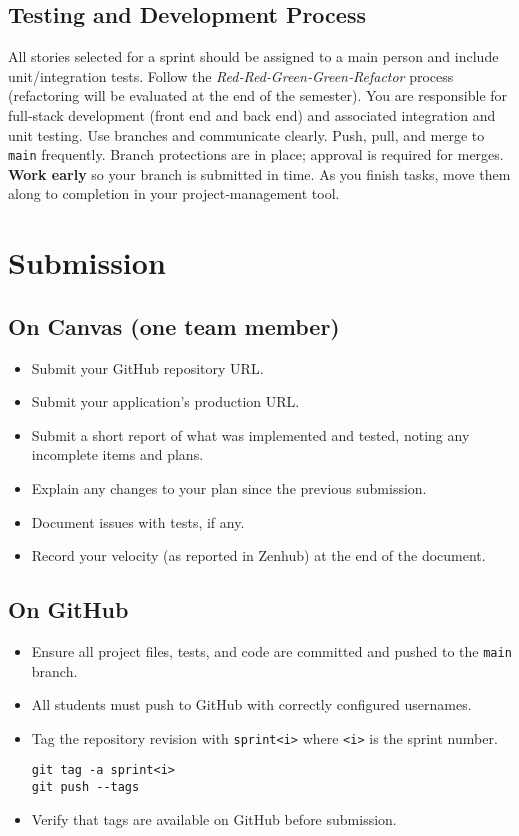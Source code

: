 \documentclass{article}
\begin{document}
\subsection*{Testing and Development Process}
All stories selected for a sprint should be assigned to a main person and include unit/integration tests. Follow the \emph{Red‑Red‑Green‑Green‑Refactor} process (refactoring will be evaluated at the end of the semester). You are responsible for full‑stack development (front end and back end) and associated integration and unit testing. 
Use branches and communicate clearly. Push, pull, and merge to \texttt{main} frequently. Branch protections are in place; approval is required for merges. \textbf{Work early} so your branch is submitted in time. As you finish tasks, move them along to completion in your project‑management tool.

\section*{Submission}

\subsection*{On Canvas (one team member)}
\begin{itemize}
\item Submit your GitHub repository URL.
\item Submit your application's production URL.
\item Submit a short report of what was implemented and tested, noting any incomplete items and plans.
\item Explain any changes to your plan since the previous submission.
\item Document issues with tests, if any.
\item Record your velocity (as reported in Zenhub) at the end of the document.
\end{itemize}

\subsection*{On GitHub}
\begin{itemize}
\item Ensure all project files, tests, and code are committed and pushed to the \texttt{main} branch.
\item All students must push to GitHub with correctly configured usernames.
\item Tag the repository revision with \verb|sprint<i>| where \verb|<i>| is the sprint number.
\begin{verbatim}
git tag -a sprint<i>
git push --tags
\end{verbatim}
\item Verify that tags are available on GitHub before submission.
\end{itemize}
\end{document}
